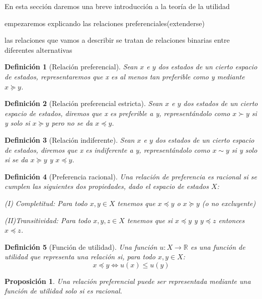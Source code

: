 \documentclass[a4paper]{report} %
\newcommand{\R}{\ensuremath{\mathbb{R}}}
\newtheorem{definicion}{Definición}[section]
\newtheorem{propo}{Proposición}[section]
\begin{document}
En esta sección daremos una breve introducción a la teoría de la utilidad 

empezaremos explicando las relaciones preferenciales(extenderse)


las relaciones que vamos a describir se tratan de relaciones binarias entre diferentes alternativas

\begin{definicion}[Relación preferencial]
 Sean $x$ e $y$ dos estados de un cierto espacio de estados, representaremos que x es al menos tan preferible como y mediante $x \succeq y$. 
\end{definicion}

\begin{definicion}[Relación preferencial estricta]
Sean $x$ e $y$ dos estados de un cierto espacio de estados, diremos que x es preferible a y, representándolo como $x \succ y$ si y solo si $x \succeq y$ pero no se da $x \preceq y$. 
\end{definicion}

\begin{definicion}[Relación indiferente]
Sean $x$ e $y$ dos estados de un cierto espacio de estados, diremos que x es indiferente a y, representándolo como $x \sim y$ si y solo si se da  $x \succeq y$ y $x \preceq y$.
\end{definicion}

\begin{definicion}[Preferencia racional]
Una relación de preferencia es racional si se cumplen las siguientes dos propiedades, dado el espacio de estados $X$:

(I) Completitud: Para todo $x,y \in X$ tenemos que $x \preceq y$ o $x \succeq y$ (o no excluyente)

(II)Transitividad: Para todo $x, y, z \in X$ tenemos que si $x \preceq y$ y $y \preceq z$ entonces $x \preceq z$.
\end{definicion}

\begin{definicion}[Función de utilidad]
Una función $u:X \to \R$ es una función de utilidad que representa una relación si, para todo $x,y \in X$:
$$ 
x \preceq y \iff u(x)\le u(y)
$$

\end{definicion}

\begin{propo}
Una relación preferencial puede ser representada mediante una función de utilidad solo si es racional.
\end{propo}
\end{document}
